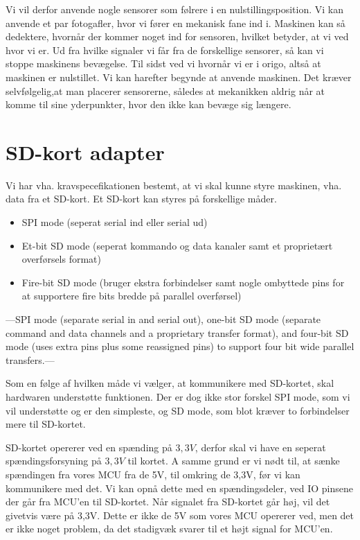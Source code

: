 Vi vil derfor anvende nogle sensorer som følrere i en
nulstillingsposition. Vi kan anvende et par fotogafler, hvor vi fører
en mekanisk fane ind i. Maskinen kan så dedektere, hvornår der kommer
noget ind for sensoren, hvilket betyder, at vi ved hvor vi er. Ud fra
hvilke signaler vi får fra de forskellige sensorer, så kan vi stoppe
maskinens bevægelse. Til sidst ved vi hvornår vi er i origo, altså at
maskinen er nulstillet. Vi kan harefter begynde at anvende
maskinen. Det kræver selvfølgelig,at man placerer sensorerne, således
at mekanikken aldrig når at komme til sine yderpunkter, hvor den ikke
kan bevæge sig længere.

\section{SD-kort adapter}
Vi har vha. kravspecefikationen bestemt, at vi skal kunne styre
maskinen, vha. data fra et SD-kort. Et SD-kort kan styres på
forskellige måder.

\begin{itemize}
\item{SPI mode (seperat serial ind eller serial ud)}
\item{Et-bit SD mode (seperat kommando og data kanaler samt et
    proprietært overførsels format)}
\item{Fire-bit SD mode (bruger ekstra forbindelser samt nogle
    ombyttede pins for at supportere fire bits bredde på parallel
    overførsel)}
\end{itemize}

---SPI mode (separate serial in and serial out), one-bit SD mode
(separate command and data channels and a proprietary transfer
format), and four-bit SD mode (uses extra pins plus some reassigned
pins) to support four bit wide parallel transfers.---



Som en følge af hvilken måde vi vælger, at kommunikere med SD-kortet,
skal hardwaren understøtte funktionen. Der er dog ikke stor forskel
SPI mode, som vi vil understøtte og er den simpleste, og SD mode, som
blot kræver to forbindelser mere til SD-kortet.

SD-kortet opererer ved en spænding på $3,3V$, derfor skal vi have en
seperat spændingsforsyning på $3,3V$ til kortet. A samme grund er vi
nødt til, at sænke spændingen fra vores MCU fra de 5V, til omkring de
3,3V, før vi kan kommunikere med det. Vi kan opnå dette med en
spændingsdeler, ved IO pinsene der går fra MCU'en til SD-kortet. Når
signalet fra SD-kortet går høj, vil det givetvis være på 3,3V. Dette
er ikke de 5V som vores MCU opererer ved, men det er ikke noget
problem, da det stadigvæk svarer til et højt signal for MCU'en.

